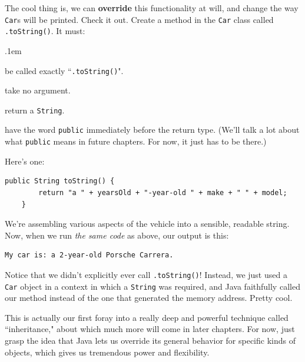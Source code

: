 \begin{samepage}
The cool thing is, we can \textbf{override} this functionality at will, and
change the way \texttt{Car}s will be printed. Check it out. Create a method in
the \texttt{Car} class called \texttt{.toString()}. It must:

\begin{compactenum}
\itemsep.1em
\item be called exactly ``\texttt{.toString()}".
\item take no argument.
\item return a \texttt{String}.
\item have the word \texttt{public} immediately before the return type. (We'll
talk a lot about what \texttt{public} means in future chapters. For now, it just has to
be there.)
\end{compactenum}
\end{samepage}

Here's one:

\begin{Verbatim}[samepage=true,fontsize=\footnotesize,frame=single]
    public String toString() {
        return "a " + yearsOld + "-year-old " + make + " " + model;
    }
\end{Verbatim}

We're assembling various aspects of the vehicle into a sensible, readable
string. Now, when we run \textit{the same code} as above, our output is this:

\begin{verbatim}
My car is: a 2-year-old Porsche Carrera.
\end{verbatim}

Notice that we didn't explicitly ever call \texttt{.toString()}! Instead, we
just used a \texttt{Car} object in a context in which a \texttt{String} was
required, and Java faithfully called our method instead of the one that
generated the memory address. Pretty cool.

This is actually our first foray into a really deep and powerful technique
called ``inheritance," about which much more will come in later chapters. For
now, just grasp the idea that Java lets us override its general behavior for
specific kinds of objects, which gives us tremendous power and flexibility.

